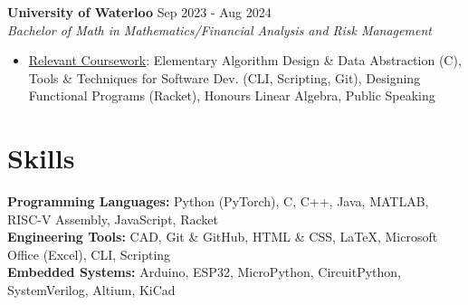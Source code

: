 \documentclass[10pt,letterpaper]{article}
\begin{document}
\raggedright
\textbf{University of Waterloo} \hfill
Sep 2023 - Aug 2024 \\
\textit{Bachelor of Math in Mathematics/Financial Analysis and Risk Management} \hfill
\begin{itemize}
    \item \underline{Relevant Coursework}: Elementary Algorithm Design \& Data Abstraction (C), Tools \& Techniques for Software Dev. (CLI, Scripting, Git), Designing Functional Programs (Racket), Honours Linear Algebra, Public Speaking
\end{itemize}













\section{Skills}

\hspace{0.75em}\textbf{Programming Languages:} Python (PyTorch), C, C++, Java, MATLAB, RISC-V Assembly, JavaScript, Racket \\

\hspace{0.75em}\textbf{Engineering Tools:} CAD, Git \& GitHub, HTML \& CSS, LaTeX, Microsoft Office (Excel), CLI, Scripting \\
\hspace{0.75em}\textbf{Embedded Systems:} Arduino, ESP32, MicroPython, CircuitPython, SystemVerilog, Altium, KiCad \\
\end{document}
